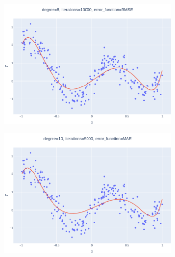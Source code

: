 \documentclass[14pt,a4]{article}
\begin{document}
\begin{figure}[h]
\begin{subfigure}{0.3\linewidth}
        \includegraphics[width=\textwidth]{images/implementation/q1/part_c/8_10000_RMSE.png}
    \end{subfigure}
    \newline
    \begin{subfigure}{0.3\linewidth}
        \centering
        \includegraphics[width=\textwidth]{images/implementation/q1/part_c/10_5000_MAE.png}
    \end{subfigure}
    \hfill
    \begin{subfigure}{0.3\textwidth}
        \centering

\end{subfigure}
\end{figure}
\end{document}
